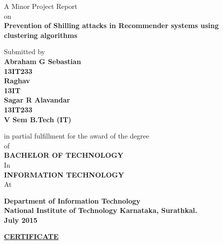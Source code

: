 \documentclass[12pt]{article}
\begin{document}
\thispagestyle{empty}
 \begin{center}
  A Minor Project Report\\
  \null
on\\
\null
\textbf{Prevention of Shilling attacks in Recommender systems using clustering algorithms}\\
\null

Submitted by \\
\null
\textbf{Abraham G Sebastian}\\
\textbf{13IT233}\\
\textbf{Raghav}\\
\textbf{13IT}\\
\textbf{Sagar R Alavandar}\\
\textbf{13IT233}\\
\textbf{V Sem B.Tech (IT)}\\
\null

in partial fulfillment for the award of the degree\\

of\\
\null
\textbf{BACHELOR OF TECHNOLOGY}\\
\null
In\\
\null
\textbf{INFORMATION TECHNOLOGY}\\
\null
At\\
\begin{figure}[h] %
\end{figure}
\textbf{Department of Information Technology\\
National Institute of Technology Karnataka, Surathkal.\\
July 2015}\\
\end{center}
\clearpage
\thispagestyle{empty}
\begin{center}
\underline{\textbf{CERTIFICATE}} \\
\end{center}
\end{document}
